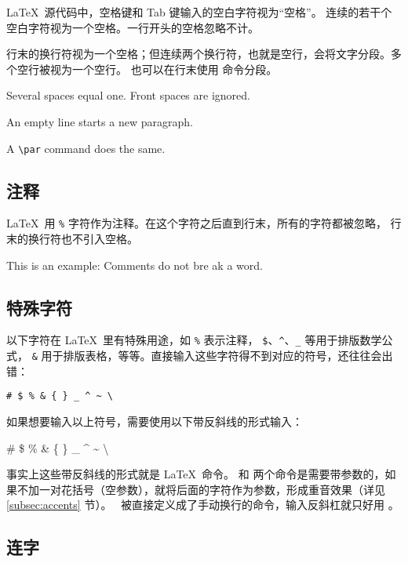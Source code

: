 \LaTeX\ 源代码中，空格键和 Tab 键输入的空白字符视为“空格”。
连续的若干个空白字符视为一个空格。一行开头的空格忽略不计。

行末的换行符视为一个空格；但连续两个换行符，也就是空行，会将文字分段。多个空行被视为一个空行。
也可以在行末使用  命令分段。
\begin{example}
Several spaces     equal one.
  Front spaces are ignored.

An empty line starts a new
paragraph.\par
A \verb|\par| command does
the same.
\end{example}

\subsection{注释}\label{subsec:comments}

\LaTeX\ 用 \texttt\% 字符作为注释。在这个字符之后直到行末，所有的字符都被忽略，
行末的换行符也不引入空格。
\begin{example}
This is an %
example: Comments do not bre%
ak a word.
\end{example}

\subsection{特殊字符}\label{subsec:special-chars}

以下字符在 \LaTeX\ 里有特殊用途，如 \texttt\% 表示注释， \texttt\$、\texttt\textasciicircum 、\texttt\_ 等用于排版数学公式，
\texttt\& 用于排版表格，等等。直接输入这些字符得不到对应的符号，还往往会出错：
\begin{verbatim}
# $ % & { } _ ^ ~ \
\end{verbatim}

如果想要输入以上符号，需要使用以下带反斜线的形式输入：
\begin{example}
\# \$ \% \& \{ \} \_
\^{} \~{} \textbackslash
\end{example}

事实上这些带反斜线的形式就是 \LaTeX\ 命令。\cmd{\textasciicircum} 和 \cmd{\textasciitilde}
两个命令是需要带参数的，如果不加一对花括号（空参数），就将后面的字符作为参数，形成重音效果（详见 \ref{subsec:accents} 节）。
\crcmd\ 被直接定义成了手动换行的命令，输入反斜杠就只好用 。

\subsection{连字}\label{subsec:ligatures}

